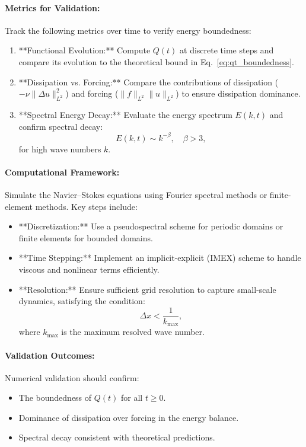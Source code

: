 \documentclass[12pt]{article}
\theoremstyle{definition}
\begin{document}
\paragraph{Metrics for Validation:}
Track the following metrics over time to verify energy boundedness:
\begin{enumerate}
    \item **Functional Evolution:** Compute $Q(t)$ at discrete time steps and compare its evolution to the theoretical bound in Eq.~\eqref{eq:qt_boundedness}.
    \item **Dissipation vs. Forcing:** Compare the contributions of dissipation ($-\nu \|\Delta u\|_{L^2}^2$) and forcing ($\|f\|_{L^2} \|u\|_{L^2}$) to ensure dissipation dominance.
    \item **Spectral Energy Decay:** Evaluate the energy spectrum $E(k, t)$ and confirm spectral decay:
    \begin{equation}
    E(k, t) \sim k^{-\beta}, \quad \beta > 3,
    \end{equation}
    for high wave numbers $k$.
\end{enumerate}

\paragraph{Computational Framework:}
Simulate the Navier--Stokes equations using Fourier spectral methods or finite-element methods. Key steps include:
\begin{itemize}
    \item **Discretization:** Use a pseudospectral scheme for periodic domains or finite elements for bounded domains.
    \item **Time Stepping:** Implement an implicit-explicit (IMEX) scheme to handle viscous and nonlinear terms efficiently.
    \item **Resolution:** Ensure sufficient grid resolution to capture small-scale dynamics, satisfying the condition:
    \begin{equation}
    \Delta x < \frac{1}{k_{\max}},
    \end{equation}
    where $k_{\max}$ is the maximum resolved wave number.
\end{itemize}

\paragraph{Validation Outcomes:}
Numerical validation should confirm:
\begin{itemize}
    \item The boundedness of $Q(t)$ for all $t \geq 0$.
    \item Dominance of dissipation over forcing in the energy balance.
    \item Spectral decay consistent with theoretical predictions.
\end{itemize}
\end{document}
